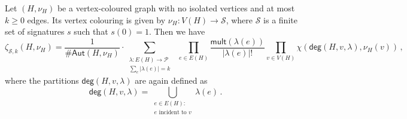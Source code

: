 \documentclass[authorcolumns,numberwithinsect]{no-lipics-v2022}
\begin{document}
\begin{theorem}\label{thm:general_coefficient}
Let $(H, \nu_H)$ be a vertex-coloured graph with no isolated vertices and at most $k \geq 0$ edges. Its vertex colouring is given by $\nu_H : V(H) \to \mathcal{S}$, where $\mathcal{S}$ is a finite set of signatures $s$ such that $s(0) = 1$. Then we have
\begin{equation} \label{eqn:Theorem_general}
    \zeta_{\mathcal{S},k}(H,\nu_H)=\frac{1}{\#\mathsf{Aut}(H, \nu_H)} \cdot \sum_{\substack{\lambda: E(H) \to \mathcal{P}\\\sum_e |\lambda(e)| = k }}\ \  \prod_{e \in E(H)} \frac{\mathsf{mult}(\lambda(e))}{|\lambda(e)|!}  \prod_{v \in V(H)} \chi(\mathsf{deg}(H, v, \lambda), \nu_H(v))\,,
\end{equation}
where the partitions $\mathsf{deg}(H, v, \lambda)$ are again defined as
\[
\mathsf{deg}(H, v, \lambda) = \bigcup_{\substack{e \in E(H):\\ e \text{ incident to }v}} \lambda(e)\,. 
\]    
\end{theorem}
\end{document}
